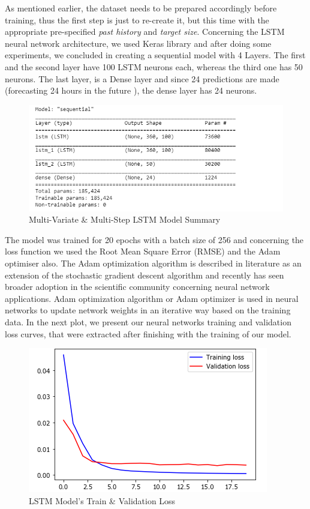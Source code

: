 \par 
As mentioned earlier, the dataset needs to be prepared accordingly before training, thus the first step is just to re-create it, but this time with the appropriate pre-specified \textit{past history} and \textit{target size}. Concerning the LSTM neural network architecture, we used Keras library \cite{keras} and after doing some experiments, we concluded in creating a sequential model with 4 Layers. The first and the second layer have 100 LSTM neurons each, whereas the third one has 50 neurons. The last layer, is a Dense layer and since 24 predictions are made (forecasting 24 hours in the future ), the dense layer has 24 neurons. 
\begin{figure}[ht!]
\centering
\includegraphics[width=0.8\linewidth]{project/lstmsummary.PNG}
\caption{Multi-Variate \& Multi-Step LSTM Model Summary}
\end{figure}
The model was trained for 20 epochs with a batch size of 256 and concerning the loss function we used the Root Mean Square Error (RMSE) and the Adam optimiser also. The Adam optimization algorithm is described in literature as an extension of the stochastic gradient descent algorithm and recently has seen broader adoption in the scientific community concerning neural network applications.  Adam optimization algorithm or Adam optimizer is used in neural networks to update network weights in an iterative way based on the training data. In the next plot, we present our neural networks training and validation loss curves, that were extracted after finishing with the training of our model.
\begin{figure}[ht!]
\centering
\includegraphics[width=0.7\linewidth]{project/tl.png}
\caption{LSTM Model's Train \& Validation Loss}
\end{figure}
